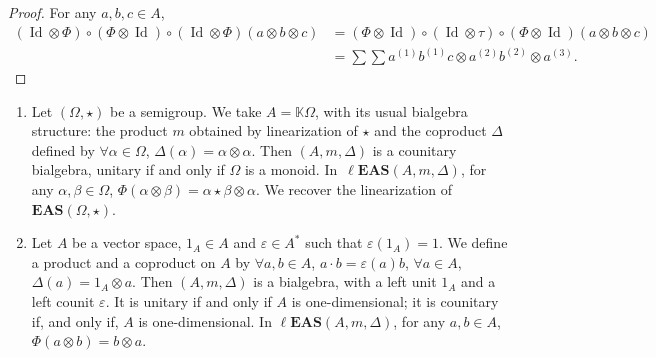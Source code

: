 \documentclass[10pt,a4paper]{amsart}
\numberwithin{equation}{section}
\newcommand{\eas}{\mathbf{EAS}}
\newcommand{\leas}{\ell\mathbf{EAS}}
\begin{document}
\begin{proof}
For any $a,b,c\in A$,
\begin{align*}
(\operatorname{Id} \otimes \Phi)\circ(\Phi\otimes \operatorname{Id})\circ (\operatorname{Id} \otimes \Phi)(a\otimes b\otimes c)&=(\Phi\otimes \operatorname{Id})\circ (\operatorname{Id} \otimes \tau)\circ (\Phi \otimes \operatorname{Id})(a\otimes b\otimes c)\\
&=\sum \sum a^{(1)}b^{(1)}c\otimes a^{(2)}b^{(2)}\otimes a^{(3)}. \tag*{\qed}
\end{align*} \renewcommand{\qed}{}\end{proof}

\begin{Example}\quad\samepage
\begin{enumerate}\itemsep=0pt
\item[(1)] Let $(\Omega,\star)$ be a semigroup. We take $A=\mathbb{K}\Omega$, with its usual bialgebra structure: the product $m$ obtained by linearization of $\star$ and the coproduct $\Delta$ defined by
$\forall \alpha \in \Omega$, $\Delta(\alpha) =\alpha \otimes \alpha$.
Then $(A,m,\Delta)$ is a counitary bialgebra, unitary if and only if $\Omega$ is a monoid. In~$\leas(A,m,\Delta)$, for any $\alpha,\beta \in \Omega$,
$\Phi(\alpha \otimes \beta)=\alpha\star \beta \otimes \alpha$.
We recover the linearization of $\eas(\Omega,\star)$.
\item[(2)] Let $A$ be a vector space, $1_A\in A$ and $\varepsilon\in A^*$ such that $\varepsilon(1_A)=1$. We define a product and a coproduct on $A$ by
$
\forall a,b\in A$, $ a\cdot b =\varepsilon(a) b$, $
\forall a\in A$, $ \Delta(a) =1_A\otimes a$.
Then $(A,m,\Delta)$ is a bialgebra, with a left unit $1_A$ and a left counit $\varepsilon$. It is unitary if and only if $A$ is one-dimensional; it is counitary if, and only if, $A$ is one-dimensional. In $\leas(A,m,\Delta)$, for any $a,b\in A$, $\Phi(a\otimes b)=b\otimes a$.
\end{enumerate}\end{Example}
\end{document}
